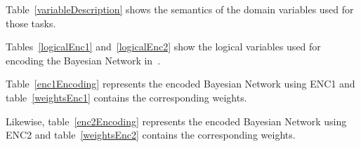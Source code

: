 Table~\ref{variableDescription} shows the semantics of the domain variables used for those tasks.


Tables~\ref{logicalEnc1} and~\ref{logicalEnc2} show the logical variables used for encoding the Bayesian Network in~\cite{bayesian_network}.



Table~\ref{enc1Encoding} represents the encoded Bayesian Network using ENC1 and table~\ref{weightsEnc1} contains the corresponding weights.
%



Likewise, table~\ref{enc2Encoding} represents the encoded Bayesian Network using ENC2 and table~\ref{weightsEnc2} contains the corresponding weights.
%


